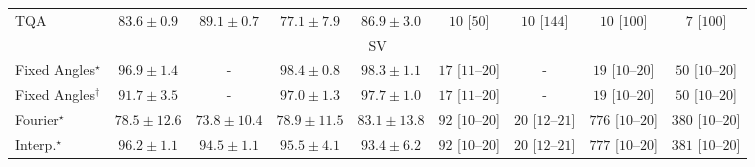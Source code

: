 \begin{tabular}{l|cccc|cccc|}
TQA & {\cellcolor[HTML]{349A52}} \color[HTML]{F1F1F1} $83.6\pm 0.9$ & {\cellcolor[HTML]{15793E}} \color[HTML]{F1F1F1} $89.1\pm 0.7$ & {\cellcolor[HTML]{68BE71}} \color[HTML]{000000} $77.1\pm 7.9$ & {\cellcolor[HTML]{228343}} \color[HTML]{F1F1F1} $86.9\pm 3.0$ & {\cellcolor[HTML]{FFF6F2}} \color[HTML]{000000} $10$ [$50$] & {\cellcolor[HTML]{FFF6F2}} \color[HTML]{000000} $10$ [$144$] & {\cellcolor[HTML]{FFF6F2}} \color[HTML]{000000} $10$ [$100$] & {\cellcolor[HTML]{FFF6F2}} \color[HTML]{000000} $7$ [$100$] \\
\cline{1-9}
\multicolumn{9}{c}{\rule{0pt}{8pt}SV} \\
\midrule
Fixed Angles$^\star$ & {\cellcolor[HTML]{034165}} \color[HTML]{F1F1F1} $96.9\pm 1.4$ & {\cellcolor[HTML]{000000}} \color[HTML]{F1F1F1} {\cellcolor{white}} \color{black} - & {\cellcolor[HTML]{023858}} \color[HTML]{F1F1F1} $98.4\pm 0.8$ & {\cellcolor[HTML]{023858}} \color[HTML]{F1F1F1} $98.3\pm 1.1$ & {\cellcolor[HTML]{FFF3F0}} \color[HTML]{000000} $17$ [$11$--$20$] & {\cellcolor[HTML]{000000}} \color[HTML]{F1F1F1} {\cellcolor{white}} \color{black} - & {\cellcolor[HTML]{FFF3F0}} \color[HTML]{000000} $19$ [$10$--$20$] & {\cellcolor[HTML]{FEEBE8}} \color[HTML]{000000} $50$ [$10$--$20$] \\
Fixed Angles$^\dagger$ & {\cellcolor[HTML]{045E93}} \color[HTML]{F1F1F1} $91.7\pm 3.5$ & {\cellcolor[HTML]{000000}} \color[HTML]{F1F1F1} {\cellcolor{white}} \color{black} - & {\cellcolor[HTML]{023F64}} \color[HTML]{F1F1F1} $97.0\pm 1.3$ & {\cellcolor[HTML]{023B5D}} \color[HTML]{F1F1F1} $97.7\pm 1.0$ & {\cellcolor[HTML]{FFF3F0}} \color[HTML]{000000} $17$ [$11$--$20$] & {\cellcolor[HTML]{000000}} \color[HTML]{F1F1F1} {\cellcolor{white}} \color{black} - & {\cellcolor[HTML]{FFF3F0}} \color[HTML]{000000} $19$ [$10$--$20$] & {\cellcolor[HTML]{FEEBE8}} \color[HTML]{000000} $50$ [$10$--$20$] \\
Fourier$^\star$ & {\cellcolor[HTML]{529BC7}} \color[HTML]{F1F1F1} $78.5\pm 12.6$ & {\cellcolor[HTML]{81AED2}} \color[HTML]{F1F1F1} $73.8\pm 10.4$ & {\cellcolor[HTML]{4E9AC6}} \color[HTML]{F1F1F1} $78.9\pm 11.5$ & {\cellcolor[HTML]{2685BB}} \color[HTML]{F1F1F1} $83.1\pm 13.8$ & {\cellcolor[HTML]{FDE1DE}} \color[HTML]{000000} $92$ [$10$--$20$] & {\cellcolor[HTML]{FFF3EF}} \color[HTML]{000000} $20$ [$12$--$21$] & {\cellcolor[HTML]{49006A}} \color[HTML]{F1F1F1} $776$ [$10$--$20$] & {\cellcolor[HTML]{F76CA3}} \color[HTML]{F1F1F1} $380$ [$10$--$20$] \\
Interp.$^\star$ & {\cellcolor[HTML]{03456C}} \color[HTML]{F1F1F1} $96.2\pm 1.1$ & {\cellcolor[HTML]{034E7B}} \color[HTML]{F1F1F1} $94.5\pm 1.1$ & {\cellcolor[HTML]{034973}} \color[HTML]{F1F1F1} $95.5\pm 4.1$ & {\cellcolor[HTML]{045585}} \color[HTML]{F1F1F1} $93.4\pm 6.2$ & {\cellcolor[HTML]{FDE1DE}} \color[HTML]{000000} $92$ [$10$--$20$] & {\cellcolor[HTML]{FFF3EF}} \color[HTML]{000000} $20$ [$12$--$21$] & {\cellcolor[HTML]{49006A}} \color[HTML]{F1F1F1} $777$ [$10$--$20$] & {\cellcolor[HTML]{F76CA3}} \color[HTML]{F1F1F1} $381$ [$10$--$20$] \\

\end{tabular}

